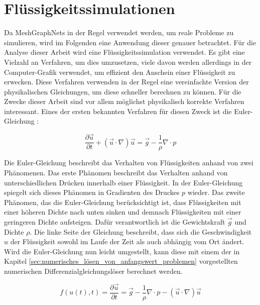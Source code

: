 
\section{Flüssigkeitssimulationen} \label{sec:simulationen}

Da MeshGraphNets in der Regel verwendet werden, um reale Probleme zu simulieren, 
wird im Folgenden eine Anwendung dieser genauer betrachtet.
Für die Analyse dieser Arbeit wird eine Flüssigkeitssimulation verwendet.
Es gibt eine Vielzahl an Verfahren, um dies umzusetzen,
viele davon werden allerdings in der Computer-Grafik verwendet, um 
effizient den Anschein einer Flüssigkeit zu erwecken.
Diese Verfahren verwenden in der Regel eine vereinfachte Version der physikalischen Gleichungen,
um diese schneller berechnen zu können.
Für die Zwecke dieser Arbeit sind vor allem möglichst physikalisch korrekte Verfahren interessant.
Eines der ersten bekannten Verfahren für diesen Zweck ist die Euler-Gleichung \cite[Kapitel~1]{navier_stokes}:

$$
\frac{\partial \vec{u}}{\partial t} + (\vec{u} \cdot \nabla) \vec{u} =  \vec{g} - \frac{1}{\rho} \nabla \cdot p
$$

Die Euler-Gleichung beschreibt das Verhalten von Flüssigkeiten anhand von zwei Phänomenen.
Das erste Phänomen beschreibt das Verhalten anhand von unterschiedlichen Drücken innerhalb einer Flüssigkeit.
In der Euler-Gleichung spiegelt sich dieses Phänomen in Gradienten des Druckes $p$ wieder.
Das zweite Phänomen, das die Euler-Gleichung berücksichtigt ist, dass Flüssigkeiten mit
einer höheren Dichte nach unten sinken und demnach Flüssigkeiten mit einer geringeren Dichte aufsteigen.
Dafür verantwortlich ist die Gewichtskraft $\vec{g}$ und Dichte $\rho$.
Die linke Seite der Gleichung beschreibt, dass sich die Geschwindigkeit $u$ der Flüssigkeit sowohl im Laufe 
der Zeit als auch abhängig vom Ort ändert.
Wird die Euler-Gleichung nun leicht umgestellt, 
kann diese mit einem der in Kapitel \ref{sec:numerisches_lösen_von_anfangswert_problemen} vorgestellten 
numerischen Differenzialgleichungslöser berechnet werden.

$$
f(u(t), t) = \frac{\partial \vec{u}}{\partial t}  =  \vec{g} - \frac{1}{\rho} \nabla \cdot p -  (\vec{u} \cdot \nabla) \vec{u}
$$

